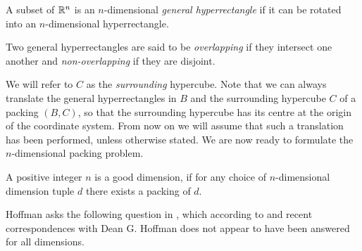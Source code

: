 \begin{definition}
A subset of $\mathbb{R}^n$ is an $n$-dimensional \textit{general hyperrectangle} if it can be rotated into an $n$-dimensional hyperrectangle.
\end{definition}

\noindent Two general hyperrectangles are said to be \textit{overlapping} if they intersect one another and \textit{non-overlapping} if they are disjoint.


\noindent We will refer to $C$ as the \textit{surrounding} hypercube. Note that we can always translate the general hyperrectangles in $B$ and the surrounding hypercube $C$ of a packing $(B, C)$, so that the surrounding hypercube has its centre at the origin of the coordinate system. From now on we will assume that such a translation has been performed, unless otherwise stated. We are now ready to formulate the $n$-dimensional packing problem.

\begin{definition}
A positive integer $n$ is a good dimension, if for any choice of $n$-dimensional dimension tuple $d$ there exists a packing of $d$.
\end{definition}

\noindent Hoffman asks the following question in \cite[p. 222]{Hoffman1981}, which according to \cite[p. 914]{berlekamp_conway_guy_2004} and recent correspondences with Dean G. Hoffman \cite{hoffman_private} does not appear to have been answered for all dimensions.

